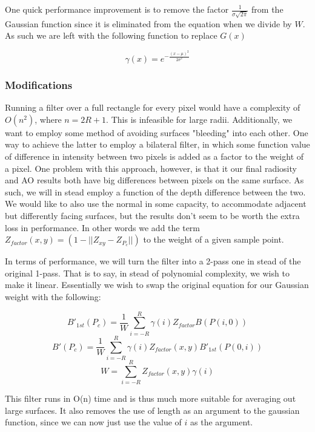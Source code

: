 One quick performance improvement is to remove the factor $\frac{1}{\sigma \sqrt{2\pi}}$ from the Gaussian function since it is eliminated from the equation when we divide by $W$. As such we are left with the following function to replace $G(x)$

$$\gamma(x) = e ^ {-\frac{(x - \mu)^2}{2\sigma^2}}$$

\subsubsection{Modifications}
Running a filter over a full rectangle for every pixel would have a complexity of $O(n^2)$, where $n=2R + 1$. This is infeasible for large radii. Additionally, we want to employ some method of avoiding surfaces "bleeding" into each other. One way to achieve the latter to employ a bilateral filter\cite{bilat}, in which some function value of difference in intensity between two pixels is added as a factor to the weight of a pixel. One problem with this approach, however, is that it our final radiosity and AO results both have big differences between pixels on the same surface. As such, we will in stead employ a function of the depth difference between the two. We would like to also use the normal in some capacity, to accommodate adjacent but differently facing surfaces, but the results don't seem to be worth the extra loss in performance. In other words we add the term $Z_{factor}(x,y) = (1 - ||Z_{xy} - Z_{P_c}||)$ to the weight of a given sample point.

In terms of performance, we will turn the filter into a 2-pass one in stead of the original 1-pass. That is to say, in stead of polynomial complexity, we wish to make it linear. Essentially we wish to swap the original equation for our Gaussian weight with the following:

$$B\prime_{1st}(P_{c}) = \frac{1}{W} \sum_{i = -R}^{R} \gamma(i) Z_{factor} B(P(i,0))$$
$$B\prime(P_{c}) = \frac{1}{W} \sum_{i = -R}^{R} \gamma(i) Z_{factor} (x,y) B\prime_{1st}(P(0,i))$$
$$W = \sum_{i = -R}^{R} Z_{factor}(x,y) \gamma(i)$$

This filter runs in O(n) time and is thus much more suitable for averaging out large surfaces.  It also removes the use of length as an argument to the gaussian function, since we can now just use the value of $i$ as the argument.